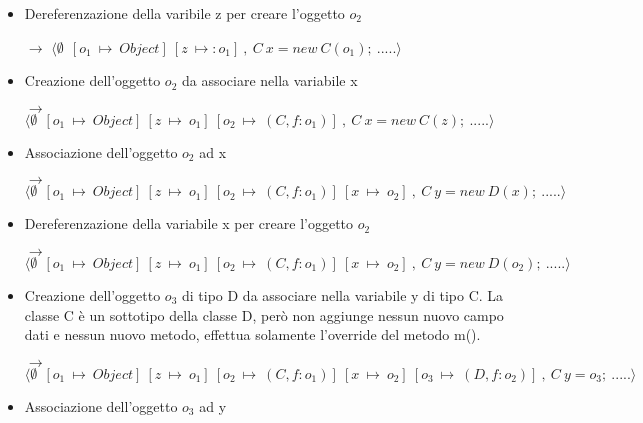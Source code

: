 \begin{itemize}
		\begin{itemize}
		\item[-] E[] $\equiv$ []
		\item[-] $t$ $\equiv$ Object z=$o_1$ 
		\item[-] $\sigma\:\equiv\:\emptyset\:\:[o_1\:\mapsto\:(Object)]$
		\end{itemize}


\vspace{0,5cm}
\item Dereferenzazione della varibile z per creare l'oggetto $o_2$

$\rightarrow$ $\langle\emptyset\:\:[o_1\:\mapsto\:Object]\:[z\:\mapsto:o_1]\:,\:C\:x=new\:C(o_1);\:.....\rangle$

\vspace{0,5cm}
\item Creazione dell'oggetto $o_2$ da associare nella variabile x

$\rightarrow$ $\langle\emptyset\:\:[o_1\:\mapsto\:Object]\:[z\:\mapsto\:o_1]\:[o_2\:\mapsto\:(C,f:o_1)]\:,\:C\:x=new\:C(z);\:.....\rangle$

\vspace{0,5cm}
\item Associazione dell'oggetto $o_2$ ad x

$\rightarrow$ $\langle\emptyset\:\:[o_1\:\mapsto\:Object]\:[z\:\mapsto\:o_1]\:[o_2\:\mapsto\:(C,f:o_1)]\:[x\:\mapsto\:o_2]\:,\:C\:y=new\:D(x);\:.....\rangle$

\vspace{0,5cm}
\item Dereferenzazione della variabile x per creare l'oggetto $o_2$

$\rightarrow$ $\langle\emptyset\:\:[o_1\:\mapsto\:Object]\:[z\:\mapsto\:o_1]\:[o_2\:\mapsto\:(C,f:o_1)]\:[x\:\mapsto\:o_2]\:,\:C\:y=new\:D(o_2);\:.....\rangle$

\vspace{0,5cm}
\item Creazione dell'oggetto $o_3$ di tipo D da associare nella variabile y di tipo C. La classe C \`e un sottotipo della classe D, per\`o non aggiunge nessun nuovo campo dati e nessun nuovo metodo, effettua solamente l'override del metodo m().

$\rightarrow$ $\langle\emptyset\:\:[o_1\:\mapsto\:Object]\:[z\:\mapsto\:o_1]\:[o_2\:\mapsto\:(C,f:o_1)]\:[x\:\mapsto\:o_2]\:[o_3\:\mapsto\:(D,f:o_2)]\:,\:C\:y=o_3;\:.....\rangle$

\vspace{0,5cm}
\item Associazione dell'oggetto $o_3$ ad y


\end{itemize}
